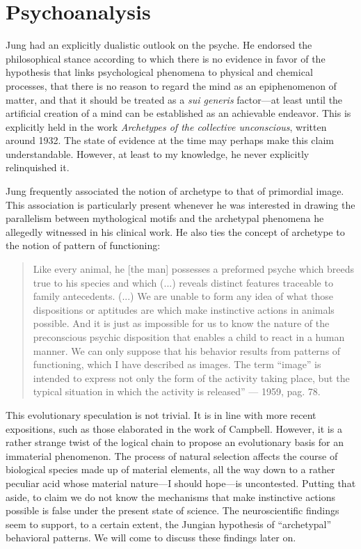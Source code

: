 \documentclass[a4paper]{article}
\begin{document}
    \section{Psychoanalysis}

    Jung had an explicitly dualistic outlook on the psyche. He endorsed
    the philosophical stance according to which there is no evidence in favor of
    the hypothesis that links psychological phenomena to physical and chemical
    processes, that there is no reason to regard the mind as an epiphenomenon of
    matter, and that it should be treated as a \textit{sui generis} factor—at least
    until the artificial creation of a mind can be established as an achievable
    endeavor. This is explicitly held in the work \textit{Archetypes of the collective
    unconscious}, written around 1932. The state of evidence at the time may
    perhaps make this claim understandable. However, at least to my
    knowledge, he never explicitly relinquished it. 

    Jung frequently associated
    the notion of archetype to that of primordial image. This association is
    particularly present whenever he was interested in drawing the parallelism
    between mythological motifs and the archetypal phenomena he allegedly
    witnessed in his clinical work. He also ties the concept of archetype to the
    notion of pattern of functioning: 

    \begin{quote}
    Like every animal, he [the man] possesses
    a preformed psyche which breeds true to his species and which (...) reveals
    distinct features traceable to family antecedents. (...) We are unable to
    form any idea of what those dispositions or aptitudes are which make
    instinctive actions in animals possible. And it is just as impossible for us
    to know the nature of the preconscious psychic disposition that enables a
    child to react in a human manner. We can only suppose that his behavior
    results from patterns of functioning, which I have described as images. The
    term “image” is intended to express not only the form of the activity taking
    place, but the typical situation in which the activity is released” — 1959,
    pag. 78. 
    \end{quote}

    This evolutionary speculation is not trivial. It is in line with
    more recent expositions, such as those elaborated in the work of Campbell.
    However, it is a rather strange twist of the logical chain to propose an
    evolutionary basis for an immaterial phenomenon. The process of natural
    selection affects the course of biological species made up of material
    elements, all the way down to a rather peculiar acid whose material nature—I
    should hope—is uncontested. Putting that aside, to claim we do not know the
    mechanisms that make instinctive actions possible is false under the present
    state of science. The neuroscientific findings seem to support, to a
    certain extent, the Jungian hypothesis of “archetypal” behavioral patterns.
    We will come to discuss these findings later on. 
\end{document}
